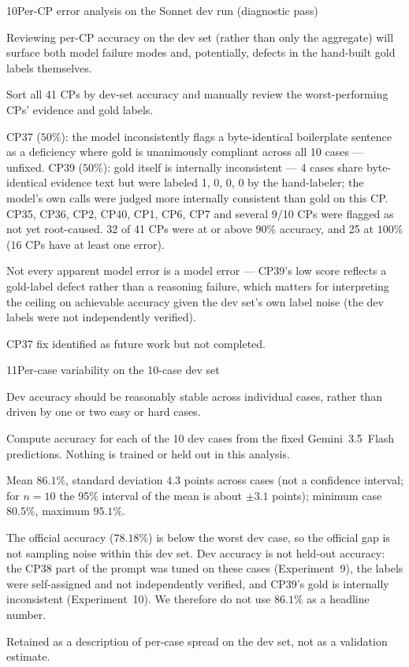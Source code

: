\begin{explog}{10}{Per-CP error analysis on the Sonnet dev run (diagnostic pass)}
\item[Hypothesis] Reviewing per-CP accuracy on the dev set (rather than only the aggregate) will surface both model failure modes and, potentially, defects in the hand-built gold labels themselves.
\item[Method] Sort all 41 CPs by dev-set accuracy and manually review the worst-performing CPs' evidence and gold labels.
\item[Result] CP37 ($50\%$): the model inconsistently flags a byte-identical boilerplate sentence as a deficiency where gold is unanimously compliant across all 10 cases --- unfixed. CP39 ($50\%$): gold itself is internally inconsistent --- 4 cases share byte-identical evidence text but were labeled 1, 0, 0, 0 by the hand-labeler; the model's own calls were judged more internally consistent than gold on this CP. CP35, CP36, CP2, CP40, CP1, CP6, CP7 and several 9/10 CPs were flagged as not yet root-caused. 32 of 41 CPs were at or above $90\%$ accuracy, and 25 at $100\%$ (16 CPs have at least one error).
\item[Inference] Not every apparent model error is a model error --- CP39's low score reflects a gold-label defect rather than a reasoning failure, which matters for interpreting the ceiling on achievable accuracy given the dev set's own label noise (the dev labels were not independently verified).
\item[Verdict] CP37 fix identified as future work but not completed.
\end{explog}


\begin{explog}{11}{Per-case variability on the 10-case dev set}
\item[Hypothesis] Dev accuracy should be reasonably stable across individual cases, rather than driven by one or two easy or hard cases.
\item[Method] Compute accuracy for each of the 10 dev cases from the fixed Gemini~3.5~Flash predictions. Nothing is trained or held out in this analysis.
\item[Result] Mean $86.1\%$, standard deviation $4.3$ points across cases (not a confidence interval; for $n=10$ the 95\% interval of the mean is about $\pm3.1$ points); minimum case $80.5\%$, maximum $95.1\%$.
\item[Inference] The official accuracy ($78.18\%$) is below the worst dev case, so the official gap is not sampling noise within this dev set. Dev accuracy is not held-out accuracy: the CP38 part of the prompt was tuned on these cases (Experiment~9), the labels were self-assigned and not independently verified, and CP39's gold is internally inconsistent (Experiment~10). We therefore do not use $86.1\%$ as a headline number.
\item[Verdict] Retained as a description of per-case spread on the dev set, not as a validation estimate.
\end{explog}


